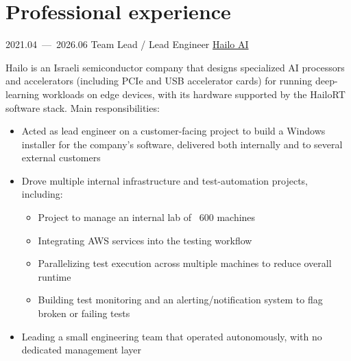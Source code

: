 \documentclass[11pt,a4paper,oneside]{moderncv}
\begin{document}
    \section{Professional experience}

        \cventry
            {2021.04~---~2026.06}
            {Team Lead / Lead Engineer}
            {\href{https://hailo.ai/}{Hailo AI}}
            {}{}
            {
                Hailo is an Israeli semiconductor company that designs specialized AI processors and accelerators (including PCIe and USB accelerator cards) for running deep-learning workloads on edge devices,
                with its hardware supported by the HailoRT software stack.
                Main responsibilities:
                \begin{itemize}
                    \item Acted as lead engineer on a customer-facing project to build a Windows installer for the company's software, delivered both internally and to several external customers
                    \item Drove multiple internal infrastructure and test-automation projects, including:
                    \begin{itemize}
                        \item Project to manage an internal lab of ~600 machines
                        \item Integrating AWS services into the testing workflow
                        \item Parallelizing test execution across multiple machines to reduce overall runtime
                        \item Building test monitoring and an alerting/notification system to flag broken or failing tests
                    \end{itemize}
                    \item Leading a small engineering team that operated autonomously, with no dedicated management layer
                \end{itemize}
            }
\end{document}
